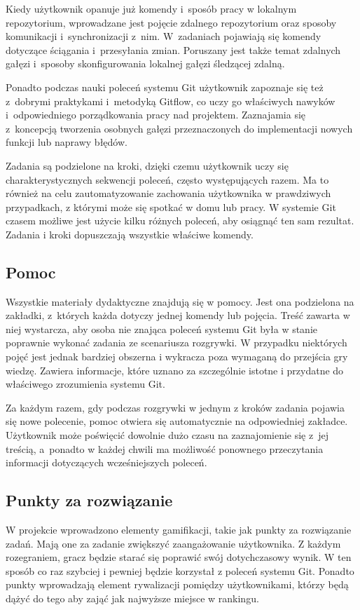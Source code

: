 \documentclass[11pt,a4paper,polish,thesis]{dcsbook}
\begin{document}
	Kiedy użytkownik opanuje już komendy i~sposób pracy w lokalnym repozytorium, wprowadzane jest pojęcie zdalnego repozytorium oraz sposoby komunikacji i~synchronizacji z~nim. W~zadaniach pojawiają się komendy dotyczące ściągania i~przesyłania zmian. Poruszany jest także temat zdalnych gałęzi i~sposoby skonfigurowania lokalnej gałęzi śledzącej zdalną.
	
	Ponadto podczas nauki poleceń systemu Git użytkownik zapoznaje się też z~dobrymi praktykami i~metodyką Gitflow, co uczy go właściwych nawyków i~odpowiedniego porządkowania pracy nad projektem. Zaznajamia się z~koncepcją tworzenia osobnych gałęzi przeznaczonych do implementacji nowych funkcji lub naprawy błędów.
	
	Zadania są podzielone na kroki, dzięki czemu użytkownik uczy się charakterystycznych sekwencji poleceń, często występujących razem. Ma to również na celu zautomatyzowanie zachowania użytkownika w prawdziwych przypadkach, z którymi może się spotkać w domu lub pracy. W systemie Git czasem możliwe jest użycie kilku różnych poleceń, aby osiągnąć ten sam rezultat. Zadania i kroki dopuszczają wszystkie właściwe komendy.
	
	\subsection{Pomoc}
	
	Wszystkie materiały dydaktyczne znajdują się w pomocy. Jest ona podzielona na zakładki, z~których każda dotyczy jednej komendy lub pojęcia. Treść zawarta w niej wystarcza, aby osoba nie znająca poleceń systemu Git była w stanie poprawnie wykonać zadania ze scenariusza rozgrywki. W przypadku niektórych pojęć jest jednak bardziej obszerna i wykracza poza wymaganą do przejścia gry wiedzę. Zawiera informacje, które uznano za szczególnie istotne i przydatne do właściwego zrozumienia systemu Git.
	
	Za każdym razem, gdy podczas rozgrywki w jednym z kroków zadania pojawia się nowe polecenie, pomoc otwiera się automatycznie na odpowiedniej zakładce. Użytkownik może poświęcić dowolnie dużo czasu na zaznajomienie się z~jej treścią, a~ponadto w każdej chwili ma możliwość ponownego przeczytania informacji dotyczących wcześniejszych poleceń.  
	
	\subsection{Punkty za rozwiązanie}

	W projekcie wprowadzono elementy gamifikacji, takie jak punkty za rozwiązanie zadań. Mają one za zadanie zwiększyć zaangażowanie użytkownika. Z każdym rozegraniem, gracz będzie starać się poprawić swój dotychczasowy wynik. W ten sposób co raz szybciej i pewniej będzie korzystał z poleceń systemu Git. Ponadto punkty wprowadzają element rywalizacji pomiędzy użytkownikami, którzy będą dążyć do tego aby zająć jak najwyższe miejsce w rankingu. 
	
\end{document}

